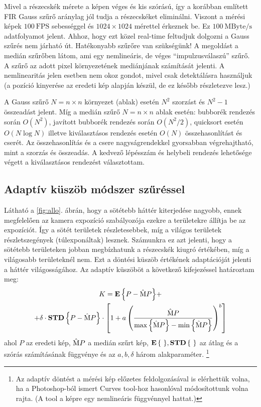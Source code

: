 	Mivel a részecskék mérete a képen véges és kis szórású, így a korábban
	említett FIR Gauss szűrő aránylag jól tudja a részecskéket eliminálni.
	Viszont a mérési képek $100\ \mathrm{FPS}$ sebességgel és $1024\times1024$ mérettel érkeznek be.
	Ez $100\ \mathrm{MByte/s}$ adatfolyamot jelent. Ahhoz, hogy ezt közel real-time feltudjuk dolgozni
	a Gauss szűrés nem járható út. Hatékonyabb szűrőre van szükségünk! A megoldást a medián szűrőben látom,
	ami egy nemlineáris, de véges ``impulzusválaszú'' szűrő.
	A szűrő az adott pixel környezetének mediánjának számítását jelenti.
	A nemlinearitás jelen esetben nem okoz gondot, mivel csak detektálásra használjuk (a pozíció
	kinyerése az eredeti kép alapján készül, de ez később részletezve lesz.)
	
	A Gauss szűrő $N = n\times n$ környezet (ablak) esetén $N^2$ szorzást és $N^2-1$ összeadást jelent. Míg
	a medián szűrő $N = n\times n$ ablak esetén: bubborék rendezés során $O(N^2)$, javított bubborék
	rendezés során $O(N^2 / 2)$, quicksort esetén $O(N\log N)$ illetve kiválasztásos rendezés esetén $O(N)$ összehasonlítást és
	cserét. Az összehasonlítás és a csere nagyságrendekkel gyorsabban végrehajtható, mint a szorzás és
	összeadás. A kedvező lépésszám és helybeli rendezés lehetősége végett a kiválasztásos rendezést választottam.
	
\subsection{Adaptív küszöb módszer szűréssel}
	Látható a \ref{fig:allo}. ábrán, hogy a sötétebb háttér kiterjedése nagyobb, ennek megfelelően az
	kamera expozíció szabályozója ezekre a területekre állítja be az expozíciót.
	Így a sötét területek részletesebbek, míg a világos területek részletszegények (túlexponáltak) lesznek.
	Számunkra ez azt jelenti, hogy a sötétebb területeken jobban megbízhatunk a részecskék kiugró
	értékében, míg a világosabb területeknél nem.
	Ezt a döntési küszöb értékének adaptációját jelenti a háttér világosságához.
	Az adaptív küszöböt a következő kifejezéssel határoztam meg:
	\begin{multline}
		\label{eq:treshold}
		K = {\mathop{\bf E\/}\left\{P-\mathrm{\hat{M}}P\right\}}+\\
		  + \delta \cdot {\mathop{\bf STD\/}\left\{P - \mathrm{\hat{M}}P\right\}} \cdot 
		\left[ 1+ a \left(
			\frac{\mathrm{\hat{M}}P}{\max\left\{\mathrm{\hat{M}}P\right\} - \min\left\{\mathrm{\hat{M}}P\right\}}
			\right)^b
		\right]
	\end{multline}
	ahol $P$ az eredeti kép, $\mathrm{\hat{M}} P$ a medián szűrt kép, ${\mathop{\bf E\/}\left\{\ \right\}}, {\mathop{\bf STD\/}\left\{\ \right\}}$ az
	átlag és a szórás számításának függvénye és az $a, b, \delta$ három alakparaméter.
	\footnote{Az adaptív döntést a mérési kép előzetes feldolgozásával is elérhettük volna,
	ha a Photoshop-ból ismert Curves tool-hoz hasonlóval módosítottunk volna rajta. (A tool a képre egy nemlineáris
	függvénnyel hattat.)}
	
